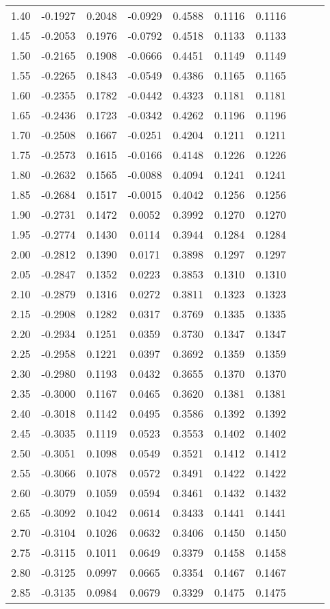 \begin{tabular}{c|c|c|c|c|c|c|c|c|c}
1.40 & -0.1927 & 0.2048 & -0.0929 & 0.4588 & 0.1116 & 0.1116\\
1.45 & -0.2053 & 0.1976 & -0.0792 & 0.4518 & 0.1133 & 0.1133\\
1.50 & -0.2165 & 0.1908 & -0.0666 & 0.4451 & 0.1149 & 0.1149\\
1.55 & -0.2265 & 0.1843 & -0.0549 & 0.4386 & 0.1165 & 0.1165\\
1.60 & -0.2355 & 0.1782 & -0.0442 & 0.4323 & 0.1181 & 0.1181\\
1.65 & -0.2436 & 0.1723 & -0.0342 & 0.4262 & 0.1196 & 0.1196\\
1.70 & -0.2508 & 0.1667 & -0.0251 & 0.4204 & 0.1211 & 0.1211\\
1.75 & -0.2573 & 0.1615 & -0.0166 & 0.4148 & 0.1226 & 0.1226\\
1.80 & -0.2632 & 0.1565 & -0.0088 & 0.4094 & 0.1241 & 0.1241\\
1.85 & -0.2684 & 0.1517 & -0.0015 & 0.4042 & 0.1256 & 0.1256\\
1.90 & -0.2731 & 0.1472 & 0.0052 & 0.3992 & 0.1270 & 0.1270 \\
1.95 & -0.2774 & 0.1430 & 0.0114 & 0.3944 & 0.1284 & 0.1284 \\
2.00 & -0.2812 & 0.1390 & 0.0171 & 0.3898 & 0.1297 & 0.1297 \\
2.05 & -0.2847 & 0.1352 & 0.0223 & 0.3853 & 0.1310 & 0.1310 \\
2.10 & -0.2879 & 0.1316 & 0.0272 & 0.3811 & 0.1323 & 0.1323 \\
2.15 & -0.2908 & 0.1282 & 0.0317 & 0.3769 & 0.1335 & 0.1335 \\
2.20 & -0.2934 & 0.1251 & 0.0359 & 0.3730 & 0.1347 & 0.1347 \\
2.25 & -0.2958 & 0.1221 & 0.0397 & 0.3692 & 0.1359 & 0.1359 \\
2.30 & -0.2980 & 0.1193 & 0.0432 & 0.3655 & 0.1370 & 0.1370 \\
2.35 & -0.3000 & 0.1167 & 0.0465 & 0.3620 & 0.1381 & 0.1381 \\
2.40 & -0.3018 & 0.1142 & 0.0495 & 0.3586 & 0.1392 & 0.1392 \\
2.45 & -0.3035 & 0.1119 & 0.0523 & 0.3553 & 0.1402 & 0.1402 \\
2.50 & -0.3051 & 0.1098 & 0.0549 & 0.3521 & 0.1412 & 0.1412 \\
2.55 & -0.3066 & 0.1078 & 0.0572 & 0.3491 & 0.1422 & 0.1422 \\
2.60 & -0.3079 & 0.1059 & 0.0594 & 0.3461 & 0.1432 & 0.1432 \\
2.65 & -0.3092 & 0.1042 & 0.0614 & 0.3433 & 0.1441 & 0.1441 \\
2.70 & -0.3104 & 0.1026 & 0.0632 & 0.3406 & 0.1450 & 0.1450 \\
2.75 & -0.3115 & 0.1011 & 0.0649 & 0.3379 & 0.1458 & 0.1458 \\
2.80 & -0.3125 & 0.0997 & 0.0665 & 0.3354 & 0.1467 & 0.1467 \\
2.85 & -0.3135 & 0.0984 & 0.0679 & 0.3329 & 0.1475 & 0.1475 \\
\end{tabular}

